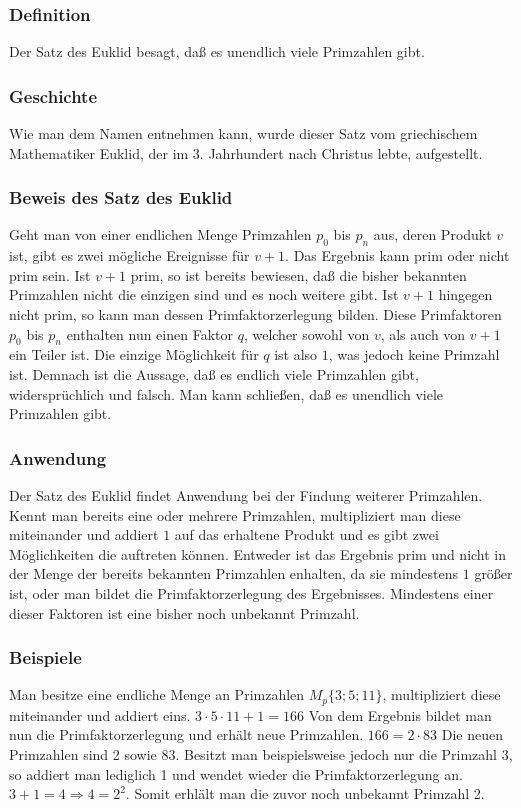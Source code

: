 \subsubsection{Definition}
Der Satz des Euklid besagt, daß es unendlich viele Primzahlen gibt.
\subsubsection{Geschichte}
Wie man dem Namen entnehmen kann, wurde dieser Satz vom griechischem Mathematiker Euklid, der im 3. Jahrhundert nach Christus lebte, aufgestellt.
\subsubsection{Beweis des Satz des Euklid}
Geht man von einer endlichen Menge Primzahlen $p_0$ bis $p_n$ aus, deren Produkt $v$ ist, gibt es zwei mögliche Ereignisse für $v + 1$. Das Ergebnis kann prim oder nicht prim sein. Ist $v + 1$ prim, so ist bereits bewiesen, daß die bisher bekannten Primzahlen nicht die einzigen sind und es noch weitere gibt. Ist $v + 1$ hingegen nicht prim, so kann man dessen Primfaktorzerlegung bilden. Diese Primfaktoren $p_0$ bis $p_n$ enthalten nun einen Faktor $q$, welcher sowohl von $v$, als auch von $v + 1$ ein Teiler ist. Die einzige Möglichkeit für $q$ ist also $1$, was jedoch keine Primzahl ist. Demnach ist die Aussage, daß es endlich viele Primzahlen gibt, widersprüchlich und falsch. Man kann schließen, daß es unendlich viele Primzahlen gibt.

\subsubsection{Anwendung}
Der Satz des Euklid findet Anwendung bei der Findung weiterer Primzahlen. Kennt man bereits eine oder mehrere Primzahlen, multipliziert man diese miteinander und addiert $1$ auf das erhaltene Produkt und es gibt zwei Möglichkeiten die auftreten können. Entweder ist das Ergebnis prim und nicht in der Menge der bereits bekannten  Primzahlen enhalten, da sie mindestens $1$ größer ist, oder man bildet die Primfaktorzerlegung des Ergebnisses. Mindestens einer dieser Faktoren ist eine bisher noch unbekannt Primzahl.
\subsubsection{Beispiele}
Man besitze eine endliche Menge an Primzahlen $M_p\{3; 5; 11\}$, multipliziert diese miteinander und addiert eins.\newline
$3 \cdot 5 \cdot 11 + 1 = 166$\newline
Von dem Ergebnis bildet man nun die Primfaktorzerlegung und erhält neue Primzahlen.\newline
$166 = 2 \cdot 83$\newline
Die neuen Primzahlen sind 2 sowie 83.\newline
Besitzt man beispielsweise jedoch nur die Primzahl $3$, so addiert man lediglich 1 und wendet wieder die Primfaktorzerlegung an. $3 + 1 = 4 \Rightarrow 4 = 2^2$. Somit erhlält man die zuvor noch unbekannt Primzahl 2.
